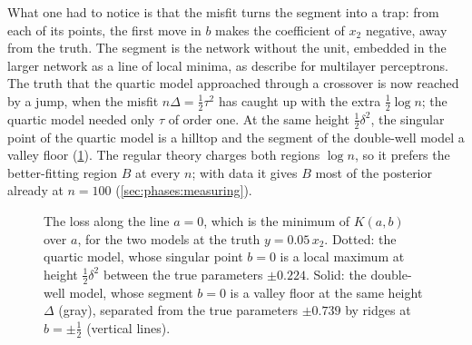 \begin{refsection}
What one had to notice is that the misfit turns the segment into a trap: from each of its points, the first move in $b$ makes the coefficient of $x_2$ negative, away from the truth. The segment is the network without the unit, embedded in the larger network as a line of local minima, as \textcite{FukumizuAmari2000} describe for multilayer perceptrons. The truth that the quartic model approached through a crossover is now reached by a jump, when the misfit $n\Delta=\frac12\tau^2$ has caught up with the extra $\frac12\log n$; the quartic model needed only $\tau$ of order one. At the same height $\frac12\delta^2$, the singular point of the quartic model is a hilltop and the segment of the double-well model a valley floor (\cref{fig:phases:profiles}). The regular theory charges both regions $\log n$, so it prefers the better-fitting region $B$ at every $n$; with data it gives $B$ most of the posterior already at $n=100$ (\cref{sec:phases:measuring}).

\begin{figure}[t]
\centering
{}
\caption{The loss along the line $a=0$, which is the minimum of $K(a,b)$ over $a$, for the two models at the truth $y=0.05\,x_2$. Dotted: the quartic model, whose singular point $b=0$ is a local maximum at height $\frac12\delta^2$ between the true parameters $\pm0.224$. Solid: the double-well model, whose segment $b=0$ is a valley floor at the same height $\Delta$ (gray), separated from the true parameters $\pm0.739$ by ridges at $b=\pm\frac12$ (vertical lines).}\label{fig:phases:profiles}
\end{figure}


\end{refsection}
